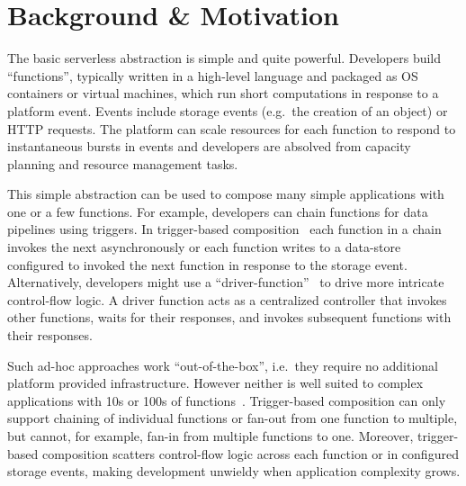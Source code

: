 \section{Background \& Motivation}\label{sec:bg}

The basic serverless abstraction is simple and quite powerful. Developers
build ``functions'', typically written in a high-level language and packaged
as OS containers or virtual machines, which run short computations in response
to a platform event. Events include storage events (e.g.\ the creation of an
object) or HTTP requests. The platform can scale resources for each function
to respond to instantaneous bursts in events and developers are absolved from
capacity planning and resource management tasks.


This simple abstraction can be used to compose many simple applications with
one or a few functions. For example, developers can chain functions for data
pipelines using triggers. In trigger-based composition~\cite{netherite} each
function in a chain invokes the next asynchronously or each function writes to
a data-store configured to invoked the next function in response to the
storage event. Alternatively, developers might use a
``driver-function''~\cite{beldi} to drive more intricate control-flow logic. A
driver function acts as a centralized controller that invokes other functions,
waits for their responses, and invokes subsequent functions with their
responses.

Such ad-hoc approaches work ``out-of-the-box'', i.e.\ they require no
additional platform provided infrastructure. However neither is well suited to
complex applications with 10s or 100s of functions~\cite{excamera,
hello-retail}. Trigger-based composition can only support chaining of
individual functions or fan-out from one function to multiple, but cannot, for
example, fan-in from multiple functions to one. Moreover, trigger-based
composition scatters control-flow logic across each function or in configured
storage events, making development unwieldy when application complexity grows.

